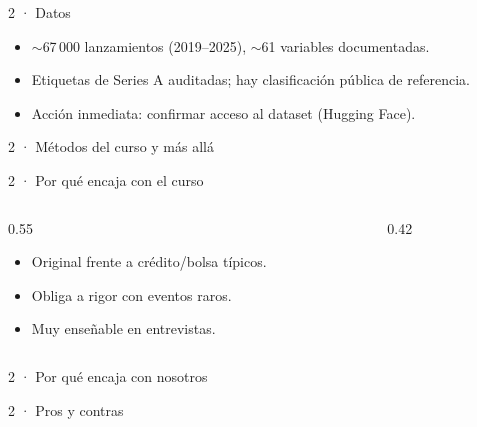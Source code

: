 \begin{frame}{2 · Datos}
  \begin{itemize}
    \item $\sim$67\,000 lanzamientos (2019--2025), $\sim$61 variables documentadas.
    \item Etiquetas de Series A auditadas; hay clasificación pública de referencia.
    \item Acción inmediata: confirmar acceso al dataset (Hugging Face).
  \end{itemize}
\end{frame}

\begin{frame}{2 · Métodos del curso y más allá}
\end{frame}

\begin{frame}{2 · Por qué encaja con el curso}
  \begin{columns}[T]
    \begin{column}{0.55\textwidth}
      \begin{itemize}
        \item Original frente a crédito/bolsa típicos.
        \item Obliga a rigor con eventos raros.
        \item Muy enseñable en entrevistas.
      \end{itemize}
    \end{column}
    \begin{column}{0.42\textwidth}
    \end{column}
  \end{columns}
\end{frame}

\begin{frame}{2 · Por qué encaja con nosotros}
\end{frame}

\begin{frame}{2 · Pros y contras}
\end{frame}

